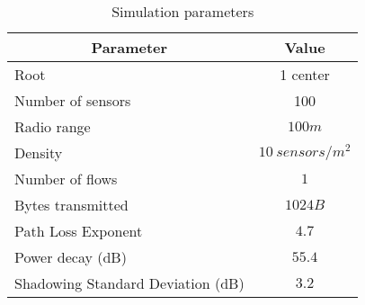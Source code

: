 \begin{table}[!ht]

\caption{Simulation parameters}
\label{tab:param}
\centering


\begin{tabular}{l|c}
\hline
\multicolumn{1}{c|}{\textbf{Parameter}} & \textbf{Value}  \\ \hline
Root                                    & 1 center        \\
Number of sensors                       & 100             \\
Radio range                             & $100m$          \\
Density                                 & $10~sensors/m^2$ \\
Number of flows                         & $1$ \\
Bytes transmitted                       & $1024B$ \\
Path Loss Exponent                      & $4.7$\\
Power decay (dB)                        & $55.4 $\\
Shadowing Standard Deviation (dB)       & $3.2 $\\
\end{tabular}

\end{table}